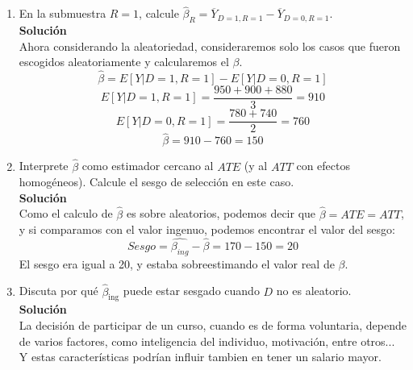 \documentclass[10pt,a4paper]{article}
\begin{document}
\begin{enumerate}
\begin{enumerate}
\item En la submuestra $R=1$, calcule $\hat\beta_{R} = \overline{Y}_{D=1,R=1}-\overline{Y}_{D=0,R=1}$.
\\
\textbf{Solución}
\\
Ahora considerando la aleatoriedad, consideraremos solo los casos que fueron escogidos aleatoriamente y calcularemos el $\beta$.
$$\hat\beta = E[{Y}|{D=1,R=1}]-E[{Y}|{D=0,R=1}]$$
$$ E[{Y}|{D=1,R=1}] = \frac{950+900+880}{3}=910$$
$$ E[{Y}|{D=0,R=1}] = \frac{780+740}{2}=760$$
$$\hat{\beta}= 910-760=150$$
\item Interprete $\hat\beta$ como estimador cercano al $ATE$ (y al $ATT$ con efectos homogéneos). Calcule el sesgo de selección en este caso.
\\
\textbf{Solución}
\\
Como el calculo de $\hat{\beta}$ es sobre aleatorios, podemos decir que $\hat{\beta}=ATE=ATT$, y si comparamos con el valor ingenuo, podemos encontrar el valor del sesgo:
$$Sesgo=\hat{\beta_{ing}}-\hat{\beta}=170-150=20$$
El sesgo era igual a 20, y estaba sobreestimando el valor real de $\beta$.
\item Discuta por qué $\hat\beta_{\text{ing}}$ puede estar sesgado cuando $D$ no es aleatorio.
\\
\textbf{Solución}
\\
La decisión de participar de un curso, cuando es de forma voluntaria, depende de varios factores, como inteligencia del individuo, motivación, entre otros... Y estas características podrían influir tambien en tener un salario mayor.
\end{enumerate}


\end{enumerate}
\end{document}
